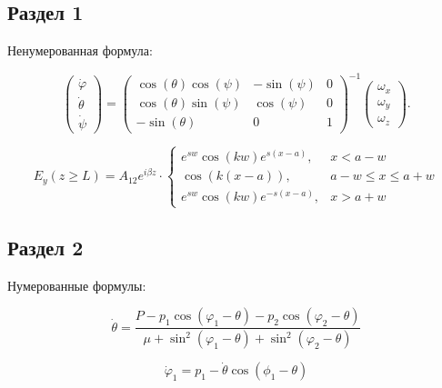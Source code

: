 \documentclass[14pt,oneside]{extarticle}
\begin{document}
\subsection{Раздел 1}

Ненумерованная формула:

\begin{equation}
    \begin{pmatrix} \dot{\varphi}\\ \dot{\theta} \\ \dot{\psi} \end{pmatrix}
    = \begin{pmatrix}
        \cos(\theta)\cos(\psi) & -\sin(\psi) & 0 \\
        \cos(\theta)\sin(\psi) & \cos(\psi)  & 0 \\
        -\sin(\theta)         & 0         &  1
    \end{pmatrix}^{-1}
    \begin{pmatrix} \omega_x\\ \omega_y \\ \omega_z \end{pmatrix}. \nonumber
\end{equation}


\begin{equation}
    E_{y}\left(z\geq L\right)=A_{12}e^{i\beta z}\cdot\begin{cases}
        e^{sw}\cos\left(kw\right)e^{s\left(x-a\right)}, & x<a-w\\
        \cos\left(k\left(x-a\right)\right), & a-w\leq x\le a+w\\
        e^{sw}\cos\left(kw\right)e^{-s\left(x-a\right)}, & x>a+w
        \end{cases}    
\end{equation}


\subsection{Раздел 2}

Нумерованные формулы:

\begin{equation}
\label{eq:1}
    \dot{\theta}=\frac{P-p_{1}\cos\left(\varphi_{1}-\theta\right)-p_{2}\cos\left(\varphi_{2}-\theta\right)}{\mu+\sin^{2}\left(\varphi_{1}-\theta\right)+\sin^{2}\left(\varphi_{2}-\theta\right)}
\end{equation}

\begin{equation}
    \dot{\varphi}_{1}=p_{1}-\dot{\theta}\cos(\phi_{1}-\theta)
\end{equation}
\end{document}
